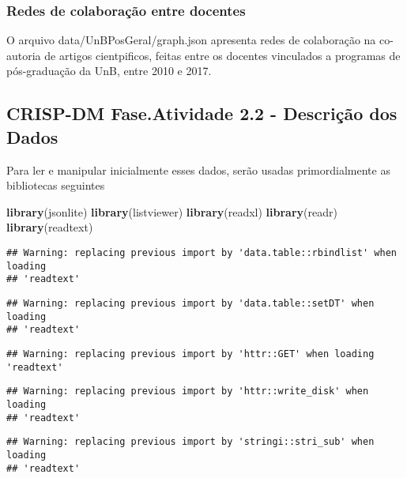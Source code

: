 \documentclass[]{article}
\newenvironment{Shaded}{\begin{snugshade}}{\end{snugshade}}
\newcommand{\KeywordTok}[1]{\textcolor[rgb]{0.13,0.29,0.53}{\textbf{#1}}}
\newcommand{\NormalTok}[1]{#1}
\begin{document}
\subsubsection{Redes de colaboração entre
docentes}\label{redes-de-colaboracao-entre-docentes}

O arquivo data/UnBPosGeral/graph.json apresenta redes de colaboração na
co-autoria de artigos cientpificos, feitas entre os docentes vinculados
a programas de pós-graduação da UnB, entre 2010 e 2017.

\subsection{CRISP-DM Fase.Atividade 2.2 - Descrição dos
Dados}\label{crisp-dm-fase.atividade-2.2---descricao-dos-dados}

Para ler e manipular inicialmente esses dados, serão usadas
primordialmente as bibliotecas seguintes

\begin{Shaded}
\begin{Highlighting}[]
\KeywordTok{library}\NormalTok{(jsonlite)}
\KeywordTok{library}\NormalTok{(listviewer)}
\KeywordTok{library}\NormalTok{(readxl)}
\KeywordTok{library}\NormalTok{(readr)}
\KeywordTok{library}\NormalTok{(readtext)}
\end{Highlighting}
\end{Shaded}

\begin{verbatim}
## Warning: replacing previous import by 'data.table::rbindlist' when loading
## 'readtext'
\end{verbatim}

\begin{verbatim}
## Warning: replacing previous import by 'data.table::setDT' when loading
## 'readtext'
\end{verbatim}

\begin{verbatim}
## Warning: replacing previous import by 'httr::GET' when loading 'readtext'
\end{verbatim}

\begin{verbatim}
## Warning: replacing previous import by 'httr::write_disk' when loading
## 'readtext'
\end{verbatim}

\begin{verbatim}
## Warning: replacing previous import by 'stringi::stri_sub' when loading
## 'readtext'
\end{verbatim}
\end{document}
